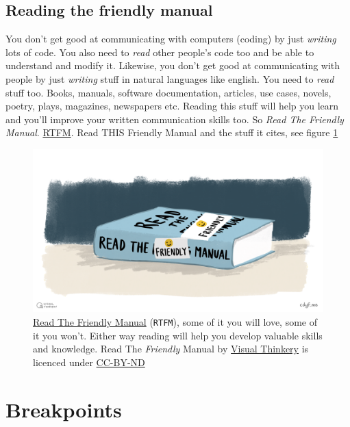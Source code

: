 \documentclass[
]{book}
\begin{document}
\hypertarget{rtfm}{%
\subsection{Reading the friendly manual}\label{rtfm}}

You don't get good at communicating with computers (coding) by just \emph{writing} lots of code. You also need to \emph{read} other people's code too and be able to understand and modify it. Likewise, you don't get good at communicating with people by just \emph{writing} stuff in natural languages like english. You need to \emph{read} stuff too. Books, manuals, software documentation, articles, use cases, novels, poetry, plays, magazines, newspapers etc. Reading this stuff will help you learn and you'll improve your written communication skills too. So \emph{Read The Friendly Manual}. \href{https://en.wikipedia.org/wiki/RTFM}{RTFM}. Read THIS Friendly Manual and the stuff it cites, see figure \ref{fig:rtfm-fig}

\begin{figure}

{\centering \includegraphics[width=1\linewidth]{images/Read the friendly manual} 

}

\caption{\href{https://en.wikipedia.org/wiki/RTFM}{Read The Friendly Manual} (\texttt{RTFM}), some of it you will love, some of it you won't. Either way reading will help you develop valuable skills and knowledge. Read The \emph{Friendly} Manual by \href{https://visualthinkery.com/}{Visual Thinkery} is licenced under \href{https://creativecommons.org/licenses/by-nd/4.0/}{CC-BY-ND}}\label{fig:rtfm-fig}
\end{figure}



\hypertarget{bp4}{%
\section{Breakpoints}\label{bp4}}
\end{document}
